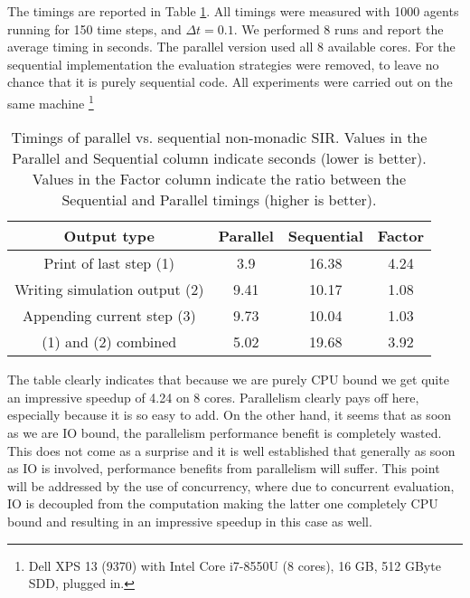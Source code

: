 The timings are reported in Table \ref{tab:parallel_nonmonadic_sir_timings}. All timings were measured with 1000 agents running for 150 time steps, and $\Delta t = 0.1$. We performed 8 runs and report the average timing in seconds. The parallel version used all 8 available cores. For the sequential implementation the evaluation strategies were removed, to leave no chance that it is purely sequential code. All experiments were carried out on the same machine \footnote{Dell XPS 13 (9370) with Intel Core i7-8550U (8 cores), 16 GB, 512 GByte SDD, plugged in.}

\begin{table}
	\centering
	\begin{tabular}{ c || c | c | c }
		Output type                   & Parallel & Sequential & Factor \\ \hline
		Print of last step (1)        & 3.9      & 16.38      & 4.24 \\ \hline
		Writing simulation output (2) & 9.41     & 10.17      & 1.08 \\ \hline
		Appending current step (3)    & 9.73     & 10.04      & 1.03 \\ \hline
		(1) and (2) combined	          & 5.02     & 19.68      & 3.92 \\ \hline
	\end{tabular}
	
	\caption[Timings of parallel vs. sequential non-monadic SIR]{Timings of parallel vs. sequential non-monadic SIR. Values in the Parallel and Sequential column indicate seconds (lower is better). Values in the Factor column indicate the ratio between the Sequential and Parallel timings (higher is better).}
	\label{tab:parallel_nonmonadic_sir_timings}
\end{table}

The table clearly indicates that because we are purely CPU bound we get quite an impressive speedup of 4.24 on 8 cores. Parallelism clearly pays off here, especially because it is so easy to add. On the other hand, it seems that as soon as we are IO bound, the parallelism performance benefit is completely wasted. This does not come as a surprise and it is well established that generally as soon as IO is involved, performance benefits from parallelism will suffer. This point will be addressed by the use of concurrency, where due to concurrent evaluation, IO is decoupled from the computation making the latter one completely CPU bound and resulting in an impressive speedup in this case as well.


